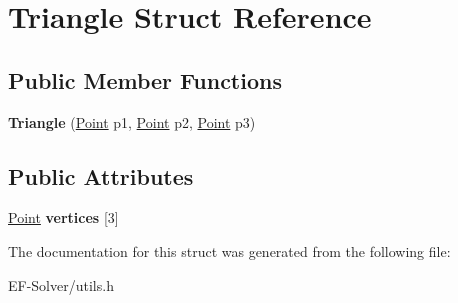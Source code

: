 \hypertarget{struct_triangle}{}\section{Triangle Struct Reference}
\label{struct_triangle}
\subsection*{Public Member Functions}
\begin{DoxyCompactItemize}
\item 
{\bfseries Triangle} (\hyperlink{struct_point}{Point} p1, \hyperlink{struct_point}{Point} p2, \hyperlink{struct_point}{Point} p3)\hypertarget{struct_triangle_a690c761752314cccae3bfef93b27c511}{}\label{struct_triangle_a690c761752314cccae3bfef93b27c511}

\end{DoxyCompactItemize}
\subsection*{Public Attributes}
\begin{DoxyCompactItemize}
\item 
\hyperlink{struct_point}{Point} {\bfseries vertices} \mbox{[}3\mbox{]}\hypertarget{struct_triangle_a4a4048f6ca1c85dda63d64e509d479e0}{}\label{struct_triangle_a4a4048f6ca1c85dda63d64e509d479e0}

\end{DoxyCompactItemize}


The documentation for this struct was generated from the following file\+:\begin{DoxyCompactItemize}
\item 
E\+F-\/\+Solver/utils.\+h\end{DoxyCompactItemize}
